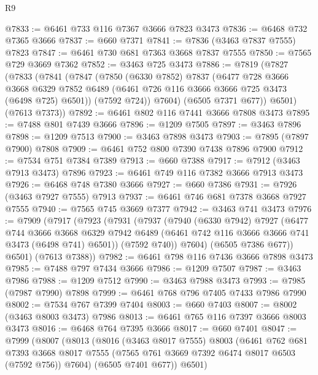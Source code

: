 \begin{lexlean}{R9}
\begin{coremodule}
@7833 := @6461 @733 @116 @7367 @3666 @7823 @3473
@7836 := @6468 @732 @7365 @3666
@7837 := @660 @7371
@7841 := @7836 (@3463 @7837 @7555) @7823
@7847 := @6461 @730 @681 @7363 @3668 @7837 @7555
@7850 := @7565 @729 @3669 @7362
@7852 := @3463 @725 @3473
@7886 := @7819
    (@7827
      (@7833
        (@7841
          (@7847
            (@7850
              (@6330 @7852)
              @7837
              (@6477
                @728
                @3666
                @3668
                @6329
                @7852
                @6489
                (@6461 @726 @116 @3666 @3666 @725 @3473 (@6498 @725) @6501))
              (@7592 @724))
            @7604)
          (@6505 @7371 @677))
        @6501)
      (@7613 @7373))
@7892 := @6461 @802 @116 @7441 @3666 @7808 @3473
@7895 := @7488 @801 @7439 @3666
@7896 := @1209 @7505
@7897 := @3463 @7896
@7898 := @1209 @7513
@7900 := @3463 @7898 @3473
@7903 := @7895 (@7897 @7900) @7808
@7909 := @6461 @752 @800 @7390 @7438 @7896 @7900
@7912 := @7534 @751 @7384 @7389
@7913 := @660 @7388
@7917 := @7912 (@3463 @7913 @3473) @7896
@7923 := @6461 @749 @116 @7382 @3666 @7913 @3473
@7926 := @6468 @748 @7380 @3666
@7927 := @660 @7386
@7931 := @7926 (@3463 @7927 @7555) @7913
@7937 := @6461 @746 @681 @7378 @3668 @7927 @7555
@7940 := @7565 @745 @3669 @7377
@7942 := @3463 @741 @3473
@7976 := @7909
    (@7917
      (@7923
        (@7931
          (@7937
            (@7940
              (@6330 @7942)
              @7927
              (@6477
                @744
                @3666
                @3668
                @6329
                @7942
                @6489
                (@6461 @742 @116 @3666 @3666 @741 @3473 (@6498 @741) @6501))
              (@7592 @740))
            @7604)
          (@6505 @7386 @677))
        @6501)
      (@7613 @7388))
@7982 := @6461 @798 @116 @7436 @3666 @7898 @3473
@7985 := @7488 @797 @7434 @3666
@7986 := @1209 @7507
@7987 := @3463 @7986
@7988 := @1209 @7512
@7990 := @3463 @7988 @3473
@7993 := @7985 (@7987 @7990) @7898
@7999 := @6461 @768 @796 @7405 @7433 @7986 @7990
@8002 := @7534 @767 @7399 @7404
@8003 := @660 @7403
@8007 := @8002 (@3463 @8003 @3473) @7986
@8013 := @6461 @765 @116 @7397 @3666 @8003 @3473
@8016 := @6468 @764 @7395 @3666
@8017 := @660 @7401
@8047 := @7999
    (@8007
      (@8013
        (@8016
          (@3463 @8017 @7555)
          @8003
          (@6461
            @762
            @681
            @7393
            @3668
            @8017
            @7555
            (@7565 @761 @3669 @7392 @6474 @8017 @6503 (@7592 @756))
            @7604)
          (@6505 @7401 @677))
        @6501)

\end{coremodule}
\end{lexlean}
